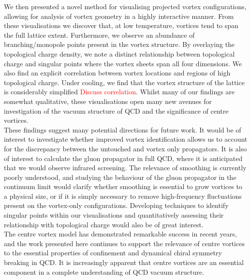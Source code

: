 We then presented a novel method for visualising projected vortex configurations, allowing for analysis of vortex geometry in a highly interactive manner. From these visualisations we discover that, at low temperature, vortices tend to span the full lattice extent. Furthermore, we observe an abundance of branching/monopole points present in the vortex structure. By overlaying the topological charge density, we note a distinct relationship between topological charge and singular points where the vortex sheets span all four dimensions. We also find an explicit correlation between vortex locations and regions of high topological charge. Under cooling, we find that the vortex structure of the lattice is considerably simplified \textcolor{red}{Discuss correlation}. Whilst many of our findings are somewhat qualitative, these visualisations open many new avenues for investigation of the vacuum structure of QCD and the significance of centre vortices.\\

These findings suggest many potential directions for future work. It would be of interest to investigate whether improved vortex identification allows us to account for the discrepancy between the untouched and vortex only propagators. It is also of interest to calculate the gluon propagator in full QCD, where it is anticipated that we would observe infrared screening. The relevance of smoothing is currently poorly understood, and studying the behaviour of the gluon propagator in the continuum limit would clarify whether smoothing is essential to grow vortices to a physical size, or if it is simply necessary to remove high-frequency fluctuations present on the vortex-only configurations. Developing techniques to identify singular points within our visualisations and quantitatively assessing their relationship with topological charge would also be of great interest.\\

The centre vortex model has demonstrated remarkable success in recent years, and the work presented here continues to support the relevance of centre vortices to the essential properties of confinement and dynamical chiral symmetry breaking in QCD. It is increasingly apparent that centre vortices are an essential component in a complete understanding of QCD vacuum structure.
